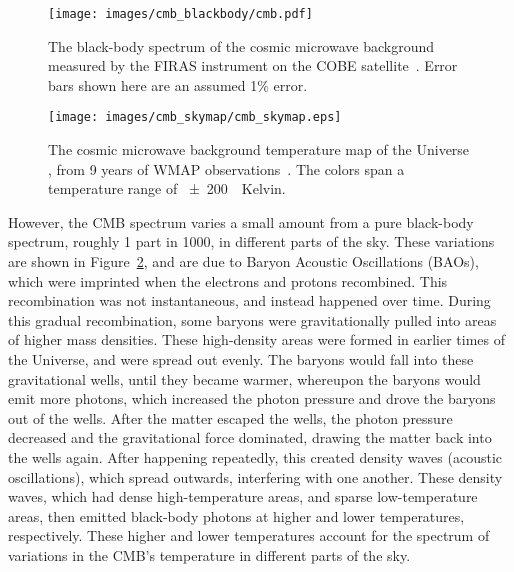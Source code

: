 \begin{figure}[!t]
  \centering
  \texttt{[image: images/cmb\_blackbody/cmb.pdf]}
  \caption[Cosmic Microwave Background Black-body Radiation]{
    The black-body spectrum of the cosmic microwave background measured by the FIRAS instrument on the COBE satellite~\cite{mather1990}.
    Error bars shown here are an assumed 1\% error.
  }
  \label{fig:cmb_black}
\end{figure}

\begin{figure}[ht]
  \centering
  \texttt{[image: images/cmb\_skymap/cmb\_skymap.eps]}
  \caption[Cosmic Microwave Background Sky Map]{
    The cosmic microwave background temperature map of the Universe \cite{wmap_skymap}, from 9 years of WMAP observations~\cite{wmap9year}.
    The colors span a temperature range of \SI{\pm200}{\mu{}Kelvin}.
  }
  \label{fig:cmb}
\end{figure}

However, the CMB spectrum varies a small amount from a pure black-body spectrum, roughly 1 part in 1000, in different parts of the sky.
These variations are shown in Figure~\ref{fig:cmb}, and are due to Baryon Acoustic Oscillations (BAOs), which were imprinted when the electrons and protons recombined.
This recombination was not instantaneous, and instead happened over time.
During this gradual recombination, some baryons were gravitationally pulled into areas of higher mass densities.
These high-density areas were formed in earlier times of the Universe, and were spread out evenly.
The baryons would fall into these gravitational wells, until they became warmer, whereupon the baryons would emit more photons, which increased the photon pressure and drove the baryons out of the wells.
After the matter escaped the wells, the photon pressure decreased and the gravitational force dominated, drawing the matter back into the wells again.
After happening repeatedly, this created density waves (acoustic oscillations), which spread outwards, interfering with one another.
These density waves, which had dense high-temperature areas, and sparse low-temperature areas, then emitted black-body photons at higher and lower temperatures, respectively.
These higher and lower temperatures account for the spectrum of variations in the CMB's temperature in different parts of the sky.

